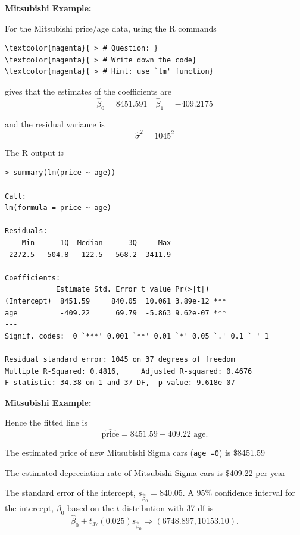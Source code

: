 \documentclass[landscape]{slides}
\newcommand{\heading}[1]{%
  \begin{center}
    \large\bf \color{red}
        #1
  \end{center}
  \vspace{1ex minus 1ex}}
\begin{document}
\begin{slide}
\heading{Mitsubishi Example:}

For the Mitsubishi price/age data, using the R commands 

\begin{Verbatim}[commandchars=\\\{\}]
\textcolor{magenta}{ > # Question: }
\textcolor{magenta}{ > # Write down the code}
\textcolor{magenta}{ > # Hint: use `lm' function}
\end{Verbatim}
%
%


gives that the estimates of the coefficients are
$$\hat{\beta}_0=8451.591 \quad \hat{\beta}_1=-409.2175$$

and the residual variance is
$$\hat{\sigma}^2=1045^2$$

The R output is 

{\small
\begin{verbatim}
> summary(lm(price ~ age))

Call:
lm(formula = price ~ age)

Residuals:
    Min      1Q  Median      3Q     Max 
-2272.5  -504.8  -122.5   568.2  3411.9 

Coefficients:
            Estimate Std. Error t value Pr(>|t|)    
(Intercept)  8451.59     840.05  10.061 3.89e-12 ***
age          -409.22      69.79  -5.863 9.62e-07 ***
---
Signif. codes:  0 `***' 0.001 `**' 0.01 `*' 0.05 `.' 0.1 ` ' 1 

Residual standard error: 1045 on 37 degrees of freedom
Multiple R-Squared: 0.4816,     Adjusted R-squared: 0.4676 
F-statistic: 34.38 on 1 and 37 DF,  p-value: 9.618e-07 

\end{verbatim}}
\end{slide}
\begin{slide}
\heading{Mitsubishi Example:}

Hence the fitted line is 
$$\hat{\mbox{price}}=8451.59-409.22 \mbox{ age}.$$

The estimated price of new Mitsubishi Sigma cars ({\tt age =0}) is \$8451.59

The estimated depreciation rate of Mitsubishi Sigma cars is \$409.22 per year

The standard error of the intercept, $s_{\hat{\beta}_0}=840.05$. A 95\% confidence
interval for the intercept, $\beta_0$ based on the $t$ distribution with 37 df is
$$\hat{\beta}_0\pm t_{37}(0.025)s_{\hat{\beta}_0} \Longrightarrow (6748.897, 10153.10).$$
\end{slide}
\end{document}
